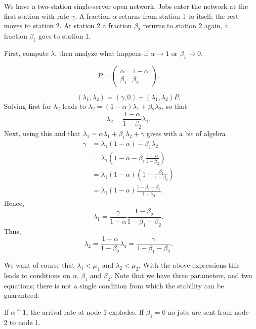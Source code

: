 \begin{exercise}
We have a two-station single-server open network.
Jobs enter the network at the first station with rate $\gamma$.
A fraction $\alpha$ returns from station 1 to itself; the rest moves to station 2.
At station 2 a fraction $\beta_2$ returns to station 2 again, a fraction $\beta_1$ goes to station 1.

First, compute $\lambda$, then analyze what happens if $\alpha\to 1$ or $\beta_1\to 0$.
\begin{solution}
 \begin{equation*}
 P = 
 \begin{pmatrix}
 \alpha & 1- \alpha \\
 \beta_1 & \beta_2
 \end{pmatrix}.
 \end{equation*}

 \begin{equation*}
 (\lambda_1, \lambda_2) = (\gamma, 0) + (\lambda_1, \lambda_2) P.
 \end{equation*}
Solving first for $\lambda_2$ leads to $\lambda_2 = (1-\alpha) \lambda_1 + \beta_2 \lambda_2$, so that 
\begin{equation*}
 \lambda_2 = \frac{1-\alpha}{1-\beta_2} \lambda_1. 
\end{equation*}
Next, using this and that $\lambda_1 = \alpha \lambda_1 + \beta_1 \lambda_2 + \gamma$ gives with a bit of algebra
\begin{equation*}
 \begin{split}
\gamma 
&= \lambda_1(1-\alpha) - \beta_1\lambda_2 \\
&= \lambda_1\left(1-\alpha - \beta_1\frac{1-\alpha}{1-\beta_2}\right) \\
&= \lambda_1(1-\alpha)\left(1 - \frac{\beta_1 }{1-\beta_2}\right) \\
&= \lambda_1(1-\alpha)\frac{1-\beta_1-\beta_2 }{1-\beta_2}.
 \end{split}
\end{equation*}
Hence, 
\begin{equation*}
 \lambda_1 = \frac\gamma{1-\alpha}\frac{1-\beta_2}{1-\beta_1-\beta_2}. 
\end{equation*}
Thus, 
\begin{equation*}
 \lambda_2 = \frac{1-\alpha}{1-\beta_2} \lambda_1 = \frac\gamma{1-\beta_1-\beta_2}. 
\end{equation*}


We want of course that $\lambda_1 < \mu_1$ and $\lambda_2 < \mu_2$.
With the above expressions this leads to conditions on $\alpha$, $\beta_1$ and $\beta_2$.
Note that we have three parameters, and two equations; there is not a single condition from which the stability can be guaranteed.

If $\alpha\uparrow 1$, the arrival rate at node $1$ explodes.
If $\beta_1=0$ no jobs are sent from node 2 to node 1.
\end{solution}
\end{exercise}


